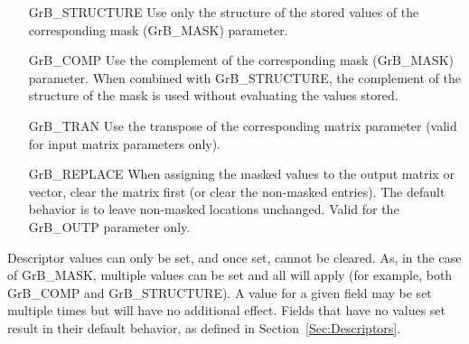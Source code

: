 \begin{itemize}[leftmargin=1.8in]
\item[{\sf GrB\_STRUCTURE}]  Use only the structure of the stored values of the 
              corresponding mask ({\sf GrB\_MASK}) parameter.
\item[{\sf GrB\_COMP}]    Use the complement of the corresponding mask ({\sf GrB\_MASK})
			  parameter.  When combined with {\sf GrB\_STRUCTURE}, the complement of 
              the structure of the mask is used without evaluating the values stored.
\item[{\sf GrB\_TRAN}]    Use the transpose of the corresponding matrix parameter
                          (valid for input matrix parameters only).
\item[{\sf GrB\_REPLACE}] When assigning the masked values to the output matrix
                          or vector, clear the matrix first (or clear the
                          non-masked entries).  The default behavior is to leave
                          non-masked locations unchanged.  Valid for the
                          {\sf GrB\_OUTP} parameter only.
\end{itemize}

Descriptor values can only be set, and once set, cannot be cleared. As, in the
case of {\sf GrB\_MASK}, multiple values can be set and all will apply (for example,
both {\sf GrB\_COMP} and {\sf GrB\_STRUCTURE}). A value 
for a given field may be set multiple times but will have no additional effect. 
Fields that have no values set result in their default behavior, as defined in 
Section~\ref{Sec:Descriptors}.
